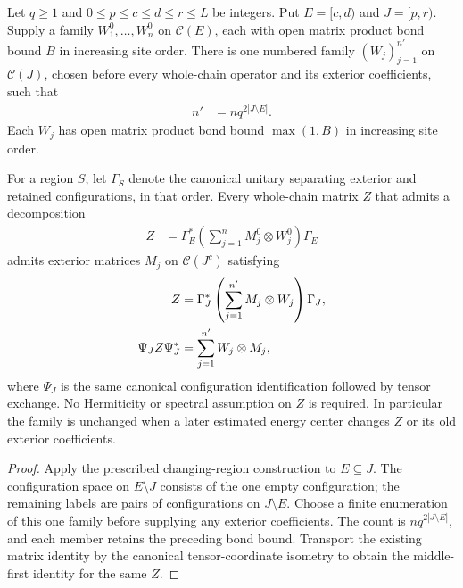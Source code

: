 \begin{lemma}
    \label{thm:common_collar_mpo_tensor_family}
    \leanok
    Let $q\ge1$ and $0\le p\le c\le d\le r\le L$ be integers.
    Put $E=[c,d)$ and $J=[p,r)$. Supply a family
    $W^0_1,\ldots,W^0_n$ on $\mathcal C(E)$, each with open matrix
    product bond bound $B$ in increasing site order. There is one
    numbered family $(W_j)_{j=1}^{n'}$ on $\mathcal C(J)$, chosen
    before every whole-chain operator and its exterior coefficients,
    such that
    \begin{align}
        n' & =nq^{2|J\setminus E|}.
    \end{align}
    Each $W_j$ has open matrix product bond bound $\max(1,B)$ in
    increasing site order.

    For a region $S$, let $\Gamma_S$ denote the canonical unitary
    separating exterior and retained configurations, in that order.
    Every whole-chain matrix $Z$ that admits a decomposition
    \begin{align}
        Z & =\Gamma_E^*\left(\sum_{j=1}^nM^0_j\otimes W^0_j\right)\Gamma_E
    \end{align}
    admits exterior matrices $M_j$ on $\mathcal C(J^c)$ satisfying
    \begin{align}
        Z                & =\Gamma_J^*\left(\sum_{j=1}^{n'}M_j\otimes W_j\right)\Gamma_J,\notag \\
        \Psi_J Z\Psi_J^* & =\sum_{j=1}^{n'}W_j\otimes M_j,
    \end{align}
    where $\Psi_J$ is the same canonical configuration identification
    followed by tensor exchange. No Hermiticity or spectral assumption
    on $Z$ is required. In particular the family is unchanged when a
    later estimated energy center changes $Z$ or its old exterior
    coefficients.
\end{lemma}
\begin{proof}\leanok
    Apply the prescribed changing-region construction to $E\subseteq J$.
    The configuration space on $E\setminus J$ consists of the one
    empty configuration; the remaining labels are pairs of configurations
    on $J\setminus E$.
    Choose a finite enumeration of this one family before supplying
    any exterior coefficients. The count is $nq^{2|J\setminus E|}$,
    and each member retains the preceding bond bound. Transport the
    existing matrix identity by the canonical tensor-coordinate
    isometry to obtain the middle-first identity for the same $Z$.
\end{proof}

